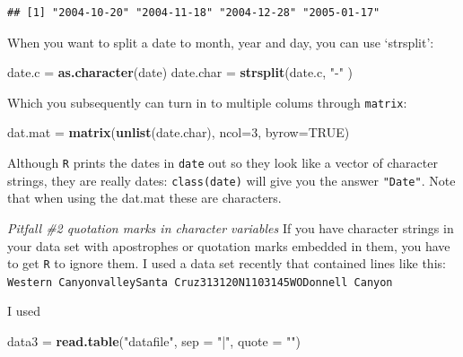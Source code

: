 \documentclass[11pt,]{article}
\newenvironment{Shaded}{\begin{snugshade}}{\end{snugshade}}
\newcommand{\KeywordTok}[1]{\textcolor[rgb]{0.13,0.29,0.53}{\textbf{#1}}}
\newcommand{\DataTypeTok}[1]{\textcolor[rgb]{0.13,0.29,0.53}{#1}}
\newcommand{\DecValTok}[1]{\textcolor[rgb]{0.00,0.00,0.81}{#1}}
\newcommand{\StringTok}[1]{\textcolor[rgb]{0.31,0.60,0.02}{#1}}
\newcommand{\OtherTok}[1]{\textcolor[rgb]{0.56,0.35,0.01}{#1}}
\newcommand{\NormalTok}[1]{#1}
\begin{document}
\begin{verbatim}
## [1] "2004-10-20" "2004-11-18" "2004-12-28" "2005-01-17"
\end{verbatim}

When you want to split a date to month, year and day, you can use
`strsplit':

\begin{Shaded}
\begin{Highlighting}[]
\NormalTok{date.c =}\StringTok{ }\KeywordTok{as.character}\NormalTok{(date)}
\NormalTok{date.char =}\StringTok{ }\KeywordTok{strsplit}\NormalTok{(date.c, }\StringTok{"-"}\NormalTok{ )}
\end{Highlighting}
\end{Shaded}

Which you subsequently can turn in to multiple colums through
\texttt{matrix}:

\begin{Shaded}
\begin{Highlighting}[]
\NormalTok{dat.mat =}\StringTok{ }\KeywordTok{matrix}\NormalTok{(}\KeywordTok{unlist}\NormalTok{(date.char), }\DataTypeTok{ncol=}\DecValTok{3}\NormalTok{, }\DataTypeTok{byrow=}\OtherTok{TRUE}\NormalTok{)}
\end{Highlighting}
\end{Shaded}

Although \texttt{R} prints the dates in \texttt{date} out so they look
like a vector of character strings, they are really dates:
\texttt{class(date)} will give you the answer \texttt{"Date"}. Note that
when using the dat.mat these are characters.

\emph{Pitfall \#2 quotation marks in character variables} If you have
character strings in your data set with apostrophes or quotation marks
embedded in them, you have to get \texttt{R} to ignore them. I used a
data set recently that contained lines like this:
\texttt{Western\ Canyon\textbar{}valley\textbar{}Santa\ Cruz\textbar{}313120N\textbar{}1103145WO\textquotesingle{}Donnell\ Canyon}

I used

\begin{Shaded}
\begin{Highlighting}[]
\NormalTok{data3 =}\StringTok{ }\KeywordTok{read.table}\NormalTok{(}\StringTok{"datafile"}\NormalTok{, }\DataTypeTok{sep =} \StringTok{"|"}\NormalTok{, }\DataTypeTok{quote =} \StringTok{""}\NormalTok{)}
\end{Highlighting}
\end{Shaded}
\end{document}

